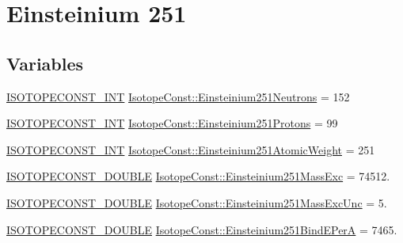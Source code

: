 \hypertarget{group___isotope_const-_einsteinium-_es251}{}\section{Einsteinium 251}
\label{group___isotope_const-_einsteinium-_es251}
\subsection*{Variables}
\begin{DoxyCompactItemize}
\item 
\mbox{\hyperlink{group___isotope_const-_macros_ga5f18360b3e99483a35c32d789e62621c}{I\+S\+O\+T\+O\+P\+E\+C\+O\+N\+S\+T\+\_\+\+I\+NT}} \mbox{\hyperlink{group___isotope_const-_einsteinium-_es251_gac4bdb60af586d51f3df2197f9c6e9782}{Isotope\+Const\+::\+Einsteinium251\+Neutrons}} = 152
\item 
\mbox{\hyperlink{group___isotope_const-_macros_ga5f18360b3e99483a35c32d789e62621c}{I\+S\+O\+T\+O\+P\+E\+C\+O\+N\+S\+T\+\_\+\+I\+NT}} \mbox{\hyperlink{group___isotope_const-_einsteinium-_es251_gae09d1b24960eef2f6bd5df84e39edf5e}{Isotope\+Const\+::\+Einsteinium251\+Protons}} = 99
\item 
\mbox{\hyperlink{group___isotope_const-_macros_ga5f18360b3e99483a35c32d789e62621c}{I\+S\+O\+T\+O\+P\+E\+C\+O\+N\+S\+T\+\_\+\+I\+NT}} \mbox{\hyperlink{group___isotope_const-_einsteinium-_es251_gab9b9cd0e8dae9a7f8815ab7467484967}{Isotope\+Const\+::\+Einsteinium251\+Atomic\+Weight}} = 251
\item 
\mbox{\hyperlink{group___isotope_const-_macros_ga8f45a7272ce02c0b4c65c44636ed719a}{I\+S\+O\+T\+O\+P\+E\+C\+O\+N\+S\+T\+\_\+\+D\+O\+U\+B\+LE}} \mbox{\hyperlink{group___isotope_const-_einsteinium-_es251_gadf603d3672c7da1c38890ebab5adc4b3}{Isotope\+Const\+::\+Einsteinium251\+Mass\+Exc}} = 74512.
\item 
\mbox{\hyperlink{group___isotope_const-_macros_ga8f45a7272ce02c0b4c65c44636ed719a}{I\+S\+O\+T\+O\+P\+E\+C\+O\+N\+S\+T\+\_\+\+D\+O\+U\+B\+LE}} \mbox{\hyperlink{group___isotope_const-_einsteinium-_es251_ga16e3281cfaf8285072bc05de9f63906a}{Isotope\+Const\+::\+Einsteinium251\+Mass\+Exc\+Unc}} = 5.
\item 
\mbox{\hyperlink{group___isotope_const-_macros_ga8f45a7272ce02c0b4c65c44636ed719a}{I\+S\+O\+T\+O\+P\+E\+C\+O\+N\+S\+T\+\_\+\+D\+O\+U\+B\+LE}} \mbox{\hyperlink{group___isotope_const-_einsteinium-_es251_ga2caf977d8190444792e74a47f50ecd5e}{Isotope\+Const\+::\+Einsteinium251\+Bind\+E\+PerA}} = 7465.

\end{DoxyCompactItemize}
